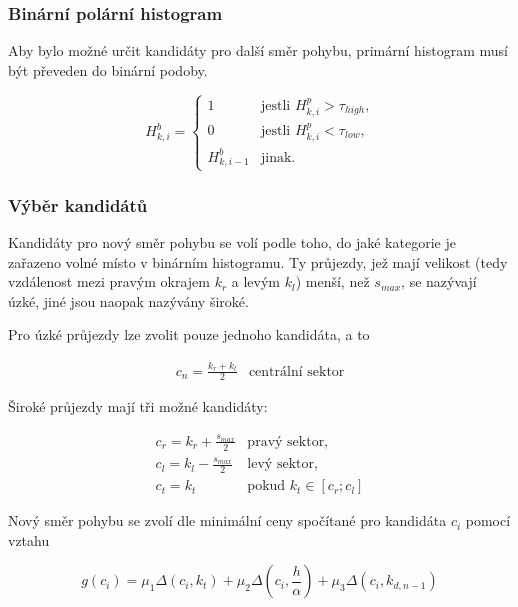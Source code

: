\documentclass[twoside]{ctuthesis}
\theoremstyle{plain}
\theoremstyle{definition}
\theoremstyle{note}
\begin{document}
\subsubsection{Binární polární histogram}

Aby bylo možné určit kandidáty pro další směr pohybu, primární histogram musí být převeden do binární podoby.

$$H_{k,i}^{b} = \left\{
\begin{array}{ll}
1&\textrm{jestli $H_{k,i}^p > \tau_{high}$,}\\
0&\textrm{jestli $H_{k,i}^p < \tau_{low}$,}\\
H_{k, i-1}^b&\textrm{jinak.}
\end{array}
\right.
$$

\subsubsection{Výběr kandidátů}

Kandidáty pro nový směr pohybu se volí podle toho, do jaké kategorie je zařazeno volné místo v binárním histogramu. Ty průjezdy, jež mají velikost (tedy vzdálenost mezi pravým okrajem $k_r$ a levým $k_l$) menší, než $s_{max}$, se nazývají úzké, jiné jsou naopak nazývány široké.

Pro úzké průjezdy lze zvolit pouze jednoho kandidáta, a to 

$$\begin{array}{ll}
c_n = \frac{k_r + k_l}{2}&\textrm{centrální sektor}
\end{array}$$

Široké průjezdy mají tři možné kandidáty:

$$\begin{array}{ll}
c_r = k_r + \frac{s_{max}}{2}&\textrm{pravý sektor,}\\

c_l = k_l - \frac{s_{max}}{2}&\textrm{levý sektor,}\\

c_t = k_t&\textrm{pokud $k_t \in \left[c_r;c_l\right]$}
\end{array}$$

Nový směr pohybu se zvolí dle minimální ceny spočítané pro kandidáta $c_i$ pomocí vztahu

\begin{equation}
g(c_i) = \mu_1 \Delta\left(c_i, k_t\right) + \mu_2\Delta\left(c_i, \frac{h}{\alpha}\right) + \mu_3\Delta\left(c_i, k_{d, n-1}\right)
\end{equation}
\end{document}
